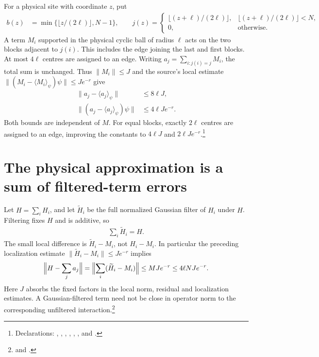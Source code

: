 \documentclass{article}
\begin{document}
For a physical site with coordinate $z$, put
\begin{align}
 b(z)&=\min\{\lfloor z/(2\ell)\rfloor,N-1\},\qquad
 j(z)=\begin{cases}
 \lfloor(z+\ell)/(2\ell)\rfloor,&\lfloor(z+\ell)/(2\ell)\rfloor<N,\\
 0,&\text{otherwise}.
 \end{cases}
 \label{eq:hastings05_rounded_assignment}
\end{align}
A term $M_i$ supported in the physical cyclic ball of radius $\ell$ acts
on the two blocks adjacent to $j(i)$. This includes the edge joining the
last and first blocks. At most $4\ell$ centres are assigned to an edge.
Writing $a_j=\sum_{i:j(i)=j}M_i$, the total sum is unchanged. Thus
$\|M_i\|\le J$ and the source's local estimate
$\|(M_i-\langle M_i\rangle_\psi)\psi\|\le Je^{-r}$ give
\begin{align}
 \|a_j-\langle a_j\rangle_\psi\|&\le8\ell J,\\
 \|(a_j-\langle a_j\rangle_\psi)\psi\|&\le4\ell J e^{-r}.
 \label{eq:hastings05_actual_pair_bounds}
\end{align}
Both bounds are independent of $M$. For equal blocks, exactly $2\ell$
centres are assigned to an edge, improving the constants to $4\ell J$
and $2\ell Je^{-r}$.\footnote{Declarations:
,
,
,
,
,
, and
.}

\section{The physical approximation is a sum of filtered-term errors}

Let $H=\sum_iH_i$, and let $\widetilde H_i$ be the full normalized Gaussian
filter of $H_i$ under $H$. Filtering fixes $H$ and is additive, so
\begin{align}
 \sum_i\widetilde H_i=H.
 \label{eq:hastings05_full_filtered_sum}
\end{align}
The small local difference is $\widetilde H_i-M_i$, not $H_i-M_i$.
In particular the preceding localization estimate
$\|\widetilde H_i-M_i\|\le Je^{-r}$ implies
\begin{align}
 \Bigl\|H-\sum_j a_j\Bigr\|
 =\Bigl\|\sum_i(\widetilde H_i-M_i)\Bigr\|
 \le MJe^{-r}\le4\ell NJe^{-r}.
 \label{eq:hastings05_actual_total_error}
\end{align}
Here $J$ absorbs the fixed factors in the local norm, residual and
localization estimates. A Gaussian-filtered term need not be close in
operator norm to the corresponding unfiltered interaction.\footnote{
 and
.}
\end{document}
